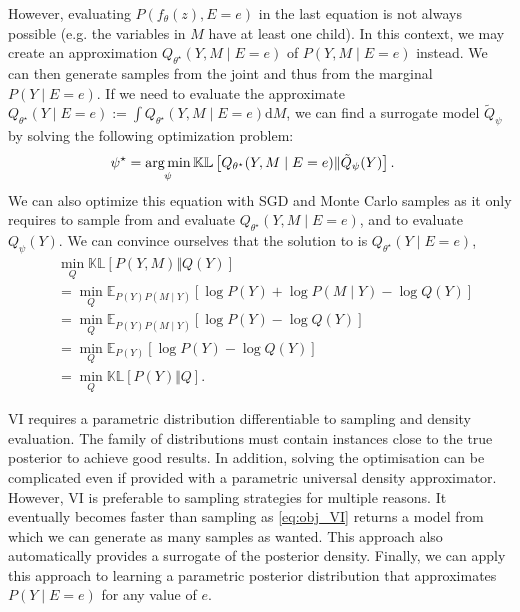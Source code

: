 However, evaluating $P(f_\theta(z), E=e)$ in the last equation is not always possible (e.g. the variables in $M$ have at least one child). In this context, we may create an approximation $Q_{\theta^\star}(Y, M\mid E=e)$ of $P(Y, M\mid E=e)$ instead. We can then generate samples from the joint and thus from the marginal $P(Y\mid E=e)$. If we need to evaluate the approximate $Q_{\theta^\star}(Y\mid E=e) := \int Q_{\theta^\star}(Y, M\mid E=e) \text{d}M$, we can find a surrogate model $\tilde Q_\psi$ by solving the following optimization problem:
\begin{align}
  \psi^\star &= \operatorname*{arg\,min}_\psi \mathbb{KL}\left[Q_{\theta^\star}(Y, M\mid E=e)\Vert \tilde Q_\psi(Y) \right]. \label{eq:approx_posterior}
\end{align}
We can also optimize this equation with SGD and Monte Carlo samples as it only requires to sample from and evaluate $Q_{\theta^\star}(Y, M\mid E=e)$, and to evaluate $Q_\psi(Y)$. We can convince ourselves that the solution to  is $Q_{\theta^\star}(Y\mid E=e)$,
\begin{align}
  &\min_Q \mathbb{KL}\left[P(Y, M)\Vert Q(Y) \right]\\
  &=\min_Q \mathbb{E}_{P(Y) P(M\mid Y)}\left[\log P(Y) + \log P(M\mid Y) - \log Q(Y)\right]\\
  &=\min_Q \mathbb{E}_{P(Y) P(M\mid Y)}\left[\log P(Y) - \log Q(Y)\right]\\
  &= \min_Q \mathbb{E}_{P(Y)}\left[\log P(Y) - \log Q(Y)\right]\\
  &= \min_Q \mathbb{KL}\left[P(Y)\Vert Q \right].
\end{align}

VI requires a parametric distribution differentiable to sampling and density evaluation. The family of distributions must contain instances close to the true posterior to achieve good results. In addition, solving the optimisation can be complicated even if provided with a parametric universal density approximator. However, VI is preferable to sampling strategies for multiple reasons. It eventually becomes faster than sampling as \ref{eq:obj_VI} returns a model from which we can generate as many samples as wanted. This approach also automatically provides a surrogate of the posterior density. Finally, we can apply this approach to learning a parametric posterior distribution that approximates $P(Y\mid E=e)$ for any value of $e$.

